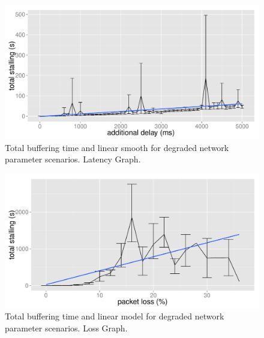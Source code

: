 
\begin{figure}[htbp]
	\centering
    \includegraphics[width=\textwidth]{images/R-delayseries.pdf}
    \caption{Total buffering time and linear smooth for degraded network parameter scenarios. Latency Graph.}
    \label{c3:fig:delayseries}
\end{figure}

\begin{figure}[htbp]
    \centering
    \includegraphics[width=\textwidth]{images/R-lossseries.pdf}
    \caption{Total buffering time and linear model for degraded network parameter scenarios. Loss Graph.}
    \label{c3:fig:lossseries}
\end{figure}




